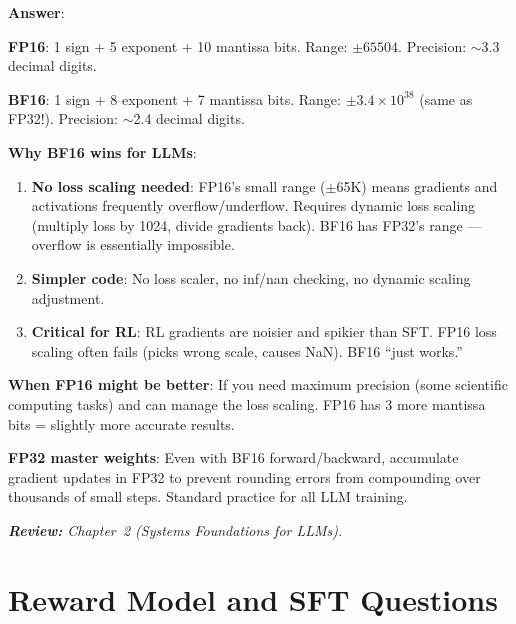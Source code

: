 \begin{questionbox}
\textbf{Answer}:

\textbf{FP16}: 1 sign + 5 exponent + 10 mantissa bits. Range: $\pm 65504$. Precision: $\sim$3.3 decimal digits.

\textbf{BF16}: 1 sign + 8 exponent + 7 mantissa bits. Range: $\pm 3.4 \times 10^{38}$ (same as FP32!). Precision: $\sim$2.4 decimal digits.

\textbf{Why BF16 wins for LLMs}:

\begin{enumerate}
  \item \textbf{No loss scaling needed}: FP16’s small range ($\pm$65K) means gradients and activations frequently overflow/underflow. Requires dynamic loss scaling (multiply loss by 1024, divide gradients back). BF16 has FP32’s range --- overflow is essentially impossible.
  \item \textbf{Simpler code}: No loss scaler, no inf/nan checking, no dynamic scaling adjustment.
  \item \textbf{Critical for RL}: RL gradients are noisier and spikier than SFT. FP16 loss scaling often fails (picks wrong scale, causes NaN). BF16 ``just works.''
\end{enumerate}

\textbf{When FP16 might be better}: If you need maximum precision (some scientific computing tasks) and can manage the loss scaling. FP16 has 3 more mantissa bits = slightly more accurate results.

\textbf{FP32 master weights}: Even with BF16 forward/backward, accumulate gradient updates in FP32 to prevent rounding errors from compounding over thousands of small steps. Standard practice for all LLM training.

\emph{\textbf{Review:} Chapter~2 (Systems Foundations for LLMs).}
\end{questionbox}

\section{Reward Model and SFT Questions}
\label{reward-model-and-sft-questions}

